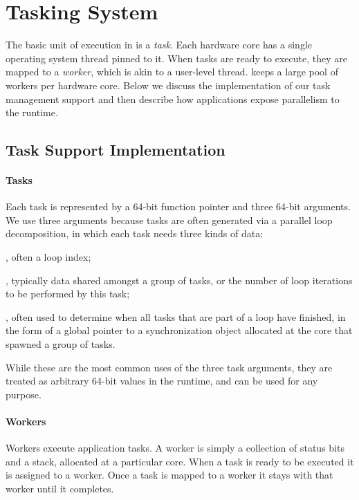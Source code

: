 \section{Tasking System}

The basic unit of execution in \Grappa is a {\em task}. Each hardware core has a single operating system thread pinned to it. When tasks are ready to execute, they are mapped to a {\em worker}, which is akin to a user-level thread. \Grappa keeps a large pool of workers per hardware core. Below we discuss the implementation of our task management support and then describe how applications expose parallelism to the \Grappa runtime.

\subsection{Task Support Implementation}

\paragraph{Tasks} Each task is represented by a 64-bit function pointer and three 64-bit arguments.  We use three arguments because tasks are often generated via a parallel loop decomposition, in which each task needs three kinds of data:

, often a loop index; 

, typically data shared amongst a group of
tasks, or the number of loop iterations to be performed by this task;

, often used to determine when all
tasks that are part of a loop have finished, in the form of a global pointer
to a synchronization object allocated at the core that spawned a group of
tasks.

While these are the most common uses of the three task arguments, they are
treated as arbitrary 64-bit values in the runtime, and can be used for any
purpose.

\paragraph{Workers} Workers execute application tasks.  A worker is simply a collection of status bits and a stack, allocated at a particular core.  When a task is ready to be executed it is assigned to a worker.  Once a task is mapped to a worker it stays with that worker until it completes.


